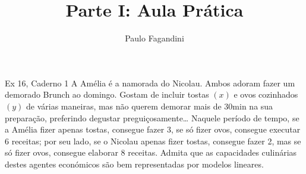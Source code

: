 \documentclass{beamer}
\author[P. Fagandini]{Paulo Fagandini}
\title[Parte I]{Parte I: Aula Pr\'atica}
\institute[ISCAL - IPL]{Lisbon Accounting and Business School}
\date{}
\begin{document}
\maketitle

\begin{frame}{Ex 16, Caderno 1}
    A Amélia é a namorada do Nicolau. Ambos adoram fazer um demorado Brunch ao
domingo. Gostam de incluir tostas $(x)$ e ovos cozinhados $(y)$ de várias maneiras, mas não
querem demorar mais de 30min na sua preparação, preferindo degustar
preguiçosamente… Naquele período de tempo, se a Amélia fizer apenas tostas,
consegue fazer 3, se só fizer ovos, consegue executar 6 receitas; por seu lado, se o
Nicolau apenas fizer tostas, consegue fazer 2, mas se só fizer ovos, consegue elaborar 8
receitas. Admita que as capacidades culinárias destes agentes económicos são bem
representadas por modelos lineares.

\end{frame}
\end{document}
